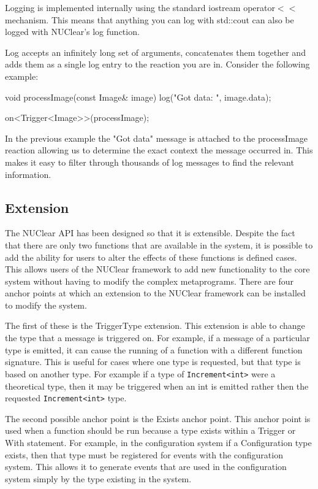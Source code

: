 \documentclass[english,12pt]{scrartcl}
\begin{document}
				Logging is implemented internally using the standard iostream operator$<<$ mechanism.
				This means that anything you can log with std::cout can also be logged with NUClear's log function.
				
				Log accepts an infinitely long set of arguments, concatenates them together and adds them as a single log entry to the reaction you are in. 
				Consider the following example: 
				
				\begin{cppcode}
					void processImage(const Image& image) {
					    log("Got data: ", image.data);
					}
					
					on<Trigger<Image>>(processImage);
				\end{cppcode}
				
				In the previous example the "Got data" message is attached to the processImage reaction allowing us to determine the exact context the message occurred in.
				This makes it easy to filter through thousands of log messages to find the relevant information.
				
		\subsection{Extension}
			The NUClear API has been designed so that it is extensible.
			Despite the fact that there are only two functions that are available in the system, it is possible to add the ability for users to alter the effects of these functions is defined cases.
			This allows users of the NUClear framework to add new functionality to the core system without having to modify the complex metaprograms.
			There are four anchor points at which an extension to the NUClear framework can be installed to modify the system.
			
			The first of these is the TriggerType extension.
			This extension is able to change the type that a message is triggered on.
			For example, if a message of a particular type is emitted, it can cause the running of a function with a different function signature.
			This is useful for cases where one type is requested, but that type is based on another type.
			For example if a type of \texttt{Increment<int>} were a theoretical type, then it may be triggered when an int is emitted rather then the requested \texttt{Increment<int>} type.
			
			The second possible anchor point is the Exists anchor point.
			This anchor point is used when a function should be run because a type exists within a Trigger or With statement.
			For example, in the configuration system if a Configuration type exists, then that type must be registered for events with the configuration system.
			This allows it to generate events that are used in the configuration system simply by the type existing in the system.
			
\end{document}
